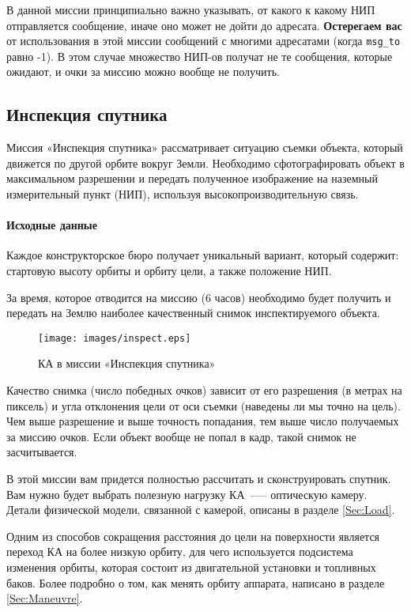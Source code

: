 \documentclass[12pt,a4paper]{article}
\begin{document}
В данной миссии принципиально важно указывать, от какого к какому НИП отправляется
сообщение, иначе оно может не дойти до адресата. \textbf{Остерегаем вас} от использования в этой
миссии сообщений с многими адресатами (когда \verb'msg_to' равно -1). В этом случае множество
НИП-ов получат не те сообщения, которые ожидают, и очки за миссию можно вообще не
получить.

\subsection{Инспекция спутника}

Миссия «Инспекция спутника» рассматривает ситуацию съемки объекта, который движется по
другой орбите вокруг Земли. Необходимо сфотографировать объект в максимальном разрешении и
передать полученное изображение на наземный измерительный пункт (НИП), используя
высокопроизводительную связь.

\paragraph{Исходные данные}

Каждое конструкторское бюро получает уникальный вариант, который содержит: стартовую
высоту орбиты и орбиту цели, а также положение НИП.

За время, которое отводится на миссию (6 часов) необходимо будет получить и передать на
Землю наиболее качественный снимок инспектируемого объекта.

\begin{figure}[tbh]
  \begin{center}
    \texttt{[image: images/inspect.eps]}
    \caption{КА в миссии «Инспекция спутника»}
    \label{Pic:SMS}
  \end{center}
\end{figure}

Качество снимка (число победных очков) зависит от  его разрешения (в метрах на пиксель) и
угла отклонения цели от оси съемки (наведены ли мы точно на цель). Чем выше разрешение и
выше точность попадания, тем выше число получаемых за миссию очков. Если объект вообще не
попал в кадр, такой снимок не засчитывается.

В этой миссии вам придется полностью рассчитать и сконструировать спутник. Вам нужно будет
выбрать полезную нагрузку КА~--— оптическую камеру. Детали физической модели,
связанной с камерой, описаны в разделе \ref{Sec:Load}.

Одним из способов сокращения расстояния до цели на поверхности является переход КА на
более низкую орбиту, для чего используется подсистема изменения орбиты, которая состоит из
двигательной установки и топливных баков. Более подробно о том, как менять орбиту
аппарата, написано в разделе \ref{Sec:Maneuvre}.
\end{document}
